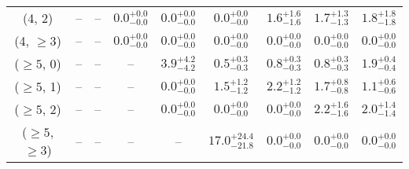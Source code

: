 \begin{table}[h!]
{\begin{tabular}{ccccccccc}
	(4, 2) & -- & -- & $0.0^{+ 0.0 }_{- 0.0 }$ & $0.0^{+ 0.0 }_{- 0.0 }$ & $0.0^{+ 0.0 }_{- 0.0 }$ & $1.6^{+ 1.6 }_{- 1.6 }$ & $1.7^{+ 1.3 }_{- 1.3 }$ & $1.8^{+ 1.8 }_{- 1.8 }$ \\[0.5ex] 
	(4, $\ge3$) & -- & -- & $0.0^{+ 0.0 }_{- 0.0 }$ & $0.0^{+ 0.0 }_{- 0.0 }$ & $0.0^{+ 0.0 }_{- 0.0 }$ & $0.0^{+ 0.0 }_{- 0.0 }$ & $0.0^{+ 0.0 }_{- 0.0 }$ & $0.0^{+ 0.0 }_{- 0.0 }$ \\[0.5ex] 
	($\ge5$, 0) & -- & -- & -- & $3.9^{+ 4.2 }_{- 4.2 }$ & $0.5^{+ 0.3 }_{- 0.3 }$ & $0.8^{+ 0.3 }_{- 0.3 }$ & $0.8^{+ 0.3 }_{- 0.3 }$ & $1.9^{+ 0.4 }_{- 0.4 }$ \\[0.5ex] 
	($\ge5$, 1) & -- & -- & -- & $0.0^{+ 0.0 }_{- 0.0 }$ & $1.5^{+ 1.2 }_{- 1.2 }$ & $2.2^{+ 1.2 }_{- 1.2 }$ & $1.7^{+ 0.8 }_{- 0.8 }$ & $1.1^{+ 0.6 }_{- 0.6 }$ \\[0.5ex] 
	($\ge5$, 2) & -- & -- & -- & $0.0^{+ 0.0 }_{- 0.0 }$ & $0.0^{+ 0.0 }_{- 0.0 }$ & $0.0^{+ 0.0 }_{- 0.0 }$ & $2.2^{+ 1.6 }_{- 1.6 }$ & $2.0^{+ 1.4 }_{- 1.4 }$ \\[0.5ex] 
	($\ge5$, $\ge3$) & -- & -- & -- & -- & $17.0^{+ 24.4 }_{- 21.8 }$ & $0.0^{+ 0.0 }_{- 0.0 }$ & $0.0^{+ 0.0 }_{- 0.0 }$ & $0.0^{+ 0.0 }_{- 0.0 }$ \\[0.5ex] 
	\hline
	\hline
\end{tabular}}
\end{table}
